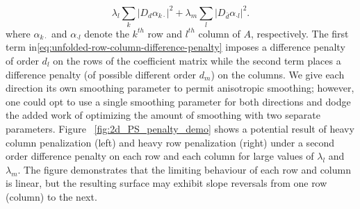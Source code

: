 \documentclass[12pt]{article}
\theoremstyle{definition}
\begin{document}
\begin{equation}\label{eq:unfolded-row-column-difference-penalty}
\lambda_l \sum_{k} \vert D_d \alpha_{k \cdot} \vert^2 + \lambda_m \sum_{l} \vert D_{\bar{d}} \alpha_{\cdot l} \vert^2 .
\end{equation}
\noindent
where $\alpha_{k \cdot}$ and $\alpha_{\cdot l}$ denote the $k^{th}$ row and $l^{th}$ column of $A$, respectively. The first term in\ref{eq:unfolded-row-column-difference-penalty} imposes a difference penalty of order $d_l$ on the rows of the coefficient matrix while the second term places a difference penalty (of possible different order $d_m$) on the columns. We give each direction its own smoothing parameter to permit anisotropic smoothing; however, one could opt to use a single smoothing parameter for both directions and dodge the added work of optimizing the amount of smoothing with two separate parameters. Figure ~\ref{fig:2d_PS_penalty_demo} shows a potential result of heavy column penalization (left) and heavy row penalization (right) under a second order difference penalty on each row and each column for large values of $\lambda_l$ and $\lambda_m$. The figure demonstrates that the limiting behaviour of each row and column is linear, but the resulting surface may exhibit slope reversals from one row (column) to the next. 
\end{document}
